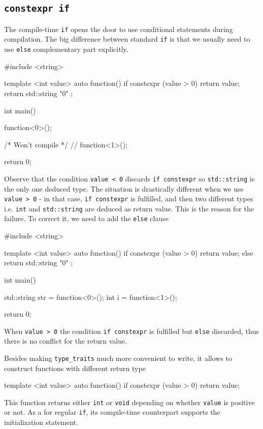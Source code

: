 \documentclass[../main]{subfiles}
\begin{document}
\subsection{\texttt{constexpr if}}
    The compile-time \texttt{if} opens the door to use conditional statements during compilation. The big difference between standard \texttt{if} is that we usually need to use
\texttt{else} complementary part explicitly.
\begin{Code}
    #include <string>
    
    template <int value>
    auto function()
    {
        if constexpr (value > 0)
        {
            return value; 
        }
        return std::string { "0" };
    }
    
    int main()
    {
        function<0>();
        
        /* Won't compile */
        // function<1>();
    
        return 0;
    }
\end{Code}
\noindent
Observe that the condition \texttt{value < 0} discards \texttt{if constexpr} so \texttt{std::string} is the only one deduced type. The situation is drastically different when we
use \texttt{value > 0} - in that case, \texttt{if constexpr} is fulfilled, and then two different types i.e. \texttt{int} and \texttt{std::string} are deduced as
return value. This is the reason for the failure. To correct it, we need to add the \texttt{else} clause

\begin{Code}
    #include <string>
    
    template <int value>
    auto function()
    {
        if constexpr (value > 0)
        {
            return value; 
        }
        else
        {
            return std::string { "0" };
        }
    }
    
    int main()
    {
        std::string str = function<0>();
        int i = function<1>();
        
        return 0;
    }
\end{Code}
\noindent
When \texttt{value > 0} the condition \texttt{if constexpr} is fulfilled but \texttt{else} discarded, thus there is no conflict for the return value.\newline

    Besides making \texttt{type\_traits} much more convenient to write, it allows to construct functions with different return type
\begin{Code}
template <int value>
auto function()
{
    if constexpr (value > 0)
    {
        return value;
    }
}
\end{Code}
\noindent
This function returns either \texttt{int} or \texttt{void} depending on whether \texttt{value} is positive or not. As a for regular \texttt{if},
its compile-time counterpart supports the initialization statement.\newline
\end{document}
